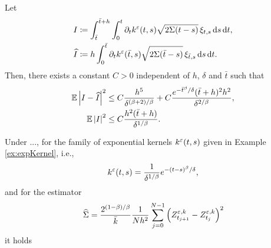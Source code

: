 \documentclass[10pt]{article}
\begin{document}
\begin{lemma}\label{lem:diffusionLemma2} Let
	\begin{equation}
	\begin{aligned}
		I &\coloneqq \int_{\bar t}^{\bar t+h} \int_0^t \partial_t k^\varepsilon(t, s) \sqrt{2\Sigma(t-s)} \, \xi_{t,s} \,\mathrm{d} s \,\mathrm{d} t, \\
		\widehat I &\coloneqq h \int_0^{\bar t} \partial_t k^\varepsilon(\bar t, s) \sqrt{2\Sigma(\bar t-s)} \, \xi_{\bar t,s} \,\mathrm{d} s \,\mathrm{d} t.
	\end{aligned}
	\end{equation}
	Then, there exists a constant $C > 0$ independent of $h$, $\delta$ and $\bar t$ such that
	\begin{equation}
	\begin{aligned}
		\operatorname{\mathbb{E}}\left\lvert I-\widehat I\right\rvert^2 &\leq C \frac{h^5}{\delta^{(\beta+2)/\beta}} + C \frac{e^{-\bar t^\beta / \delta} (\bar t + h)^2h^2}{\delta^{2/\beta}}, \\
		\operatorname{\mathbb{E}}\left\lvert I\right\rvert^2 &\leq C \frac{h^2(\bar t + h)}{\delta^{1/\beta}}.
	\end{aligned}
	\end{equation}
\end{lemma}
\begin{proposition} Under ..., for the family of exponential kernels $k^\varepsilon(t,s)$ given in Example \ref{ex:expKernel}, i.e.,
	\begin{equation}
		k^\varepsilon(t, s) = \frac{1}{\delta^{1/\beta}} e^{-(t-s)^\beta/\delta},
	\end{equation}
	and for the estimator
	\begin{equation}
		\widehat \Sigma = \frac{2^{(1-\beta)/\beta}}{\bar k} \frac{1}{Nh^2} \sum_{j=0}^{N-1} \left(Z^{\varepsilon,k}_{t_{j+1}} - Z^{\varepsilon,k}_{t_j}\right)^2
	\end{equation}
	it holds	
\end{proposition}
\end{document}
